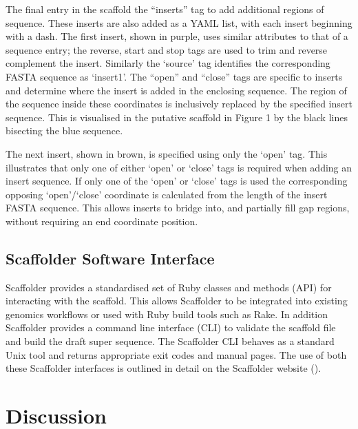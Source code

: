 \documentclass[10pt]{bmc_article}
\newenvironment{bmcformat}{\begin{raggedright}\baselineskip20pt\sloppy\setboolean{publ}{false}}{\end{raggedright}\baselineskip20pt\sloppy}
\begin{document}
\begin{bmcformat}
The final entry in the scaffold  the ``inserts''
tag to add additional regions of sequence. These inserts are also added as
a YAML list, with each insert beginning with a dash. The first insert, shown
in purple, uses similar attributes to that of a sequence entry; the reverse,
start and stop tags are used to trim and reverse complement the insert.
Similarly the `source' tag identifies the corresponding FASTA sequence as
`insert1'. The ``open'' and ``close'' tags are specific to inserts and
determine where the insert is added in the enclosing sequence. The region of
the sequence inside these coordinates is inclusively replaced by the specified
insert sequence. This is visualised in the putative scaffold in Figure 1 by
the black lines bisecting the blue sequence. \pb

The next insert, shown in brown, is specified using only the `open' tag. This
illustrates that only one of either `open' or `close' tags is required when
adding an insert sequence. If only one of the `open' or `close' tags is used
the corresponding opposing `open'/`close' coordinate is calculated from the
length of the insert FASTA sequence. This allows inserts to bridge into, and
partially fill gap regions, without requiring an end coordinate position. \pb

\subsection*{Scaffolder Software Interface} %

Scaffolder provides a standardised set of Ruby classes and methods (API) for
interacting with the scaffold. This allows Scaffolder to be integrated into
existing genomics workflows or used with Ruby build tools such as Rake. In
addition Scaffolder provides a command line interface (CLI) to validate the
scaffold file and build the draft super sequence. The Scaffolder CLI behaves
as a standard Unix tool and returns appropriate exit codes and manual pages.
The use of both these Scaffolder interfaces is outlined in detail on the
Scaffolder website (\scaffolder).  \pb

\clearpage

\section*{Discussion} %


\end{bmcformat}
\end{document}
